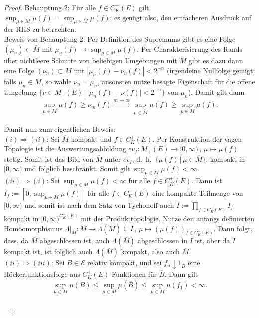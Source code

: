 \documentclass[twoside]{article}
\theoremstyle{definition}
\begin{document}
\begin{proof}
Behauptung 2: Für alle $f \in C_K^+(E)$ gilt $\sup_{\mu \in M} \mu(f) = \sup_{\mu \in \overline{M}} \mu(f)$; es genügt also, den einfacheren Ausdruck auf der RHS zu betrachten.\\

Beweis von Behauptung 2: Per Definition des Supremums gibt es eine Folge $(\mu_n) \subset \overline{M}$ mit $\mu_n(f) \to \sup_{\mu \in \overline{M}} \mu(f)$. Per Charakterisierung des Rands über nichtleere Schnitte von beliebigen Umgebungen mit $M$ gibt es dazu dann eine Folge $(\nu_n) \subset M$ mit $|\mu_n(f) - \nu_n(f)| < 2^{-n}$ (irgendeine Nullfolge genügt; falls $\mu_n \in M$, so wähle $\nu_n = \mu_n$, ansonsten nutze besagte Eigenschaft für die offene Umgebung $\{\nu \in M_+(E) \, | \, |\mu_n(f) - \nu(f)| < 2^{-n} \}$ von $\mu_n$). Damit gilt dann 
\begin{align}
\sup_{\mu \in M} \mu(f) \geq \nu_m(f) \xrightarrow{m \to \infty} \sup_{\mu \in \overline{M}} \mu(f) \geq \sup_{\mu \in M} \mu(f).
\end{align}

Damit nun zum eigentlichen Beweis:\\

$(i) \Longrightarrow (ii)$: Sei $\overline{M}$ kompakt und $f \in C_K^+(E)$. Per Konstruktion der vagen Topologie ist die Auswertungsabbildung $ev_f:M_+(E) \to [0,\infty) \, , \, \mu \mapsto \mu(f)$ stetig. Somit ist das Bild von $\overline{M}$ unter $ev_f$, d.\ h.\ $\{\mu(f) \, | \, \mu \in \overline{M} \}$, kompakt in $[0,\infty)$ und folglich beschränkt. Somit gilt $\sup_{\mu \in \overline{M}} \mu(f) < \infty$.\\

$(ii) \Longrightarrow (i)$: Sei $\sup_{\mu \in \overline{M}} \mu(f) < \infty$ für alle $f \in C_K^+(E)$. Dann ist $I_f := [0 , \sup_{\mu \in \overline{M}} \mu(f)]$ für alle $f \in C_K^+(E)$ eine kompakte Teilmenge von $[0,\infty)$ und somit ist nach dem Satz von Tychonoff auch $I:= \prod_{f \in C_K^+(E)} I_f$ kompakt in $[0,\infty)^{C_K^+(E)}$ mit der Produkttopologie. Nutze den anfangs definierten Homöomorphismus $\Lambda|_{\overline{M}}:\overline{M} \to \Lambda(\overline{M}) \subseteq I \, , \, \mu \mapsto (\mu(f))_{f \in C_K^+(E)}$. Dann folgt, dass, da $\overline{M}$ abgeschlossen ist, auch $\Lambda(\overline{M})$ abgeschlossen in $I$ ist, aber da $I$ kompakt ist, ist folglich auch $\Lambda(\overline{M})$ kompakt, also auch $\overline{M}$.\\

$(ii) \Longrightarrow (iii)$: Sei $B \in \mathcal{E}$ relativ kompakt, und sei $f_n \downarrow 1_{\overline{B}}$ eine Höckerfunktionsfolge aus $C_K^+(E)$-Funktionen für $\overline{B}$. Dann gilt
\begin{align}
\sup_{\mu \in M} \mu(B) \leq \sup_{\mu \in M} \mu(\overline{B}) \leq \sup_{\mu \in M} \mu(f_1) < \infty.
\end{align}\\


\end{proof}
\end{document}
